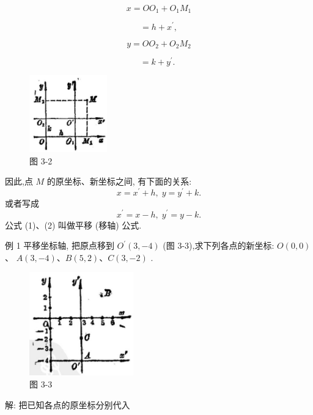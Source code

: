 \documentclass[lang=cn,newtx,10pt,scheme=chinese]{elegantbook}
\begin{document}
\[
  x = O{O}_{1} + {O}_{1}{M}_{1}
\]

\[
  = h + {x}^{\prime },
\]

\[
  y = O{O}_{2} + {O}_{2}{M}_{2}
\]

\[
  = k + {y}^{\prime }\text{. }
\]

\begin{figure}[h]
  \centering
  \includegraphics[max width=0.3\textwidth]{images/01912cc2-ffb6-728e-9ae7-b113ff05c64b_134_803889.jpg}
  \caption{图 3-2}
\end{figure}


\begin{corollary}[平移 (移轴) 公式]
因此,点 \(M\) 的原坐标、新坐标之间, 有下面的关系:
\[
  x = {x}^{\prime } + h,\;y = {y}^{\prime } + k. \tag{1}
\]
或者写成
\[
    {x}^{\prime } = x - h,\;{y}^{\prime } = y - k. \tag{2}
\]
公式 (1)、(2) 叫做平移 (移轴) 公式.
\end{corollary}

例 1 平移坐标轴, 把原点移到 \({O}^{\prime }\left( {3, - 4}\right)\) (图 3-3),求下列各点的新坐标: \(O\left( {0,0}\right)\) 、 \(A\left( {3, - 4}\right) \text{、}B\left( {5,2}\right) \text{、}C\left( {3, - 2}\right)\) .

\begin{figure}[h]
  \centering
  \includegraphics[max width=0.4\textwidth]{images/01912cc2-ffb6-728e-9ae7-b113ff05c64b_134_527625.jpg}
  \caption{图 3-3}
\end{figure}



解: 把已知各点的原坐标分别代入
\end{document}
